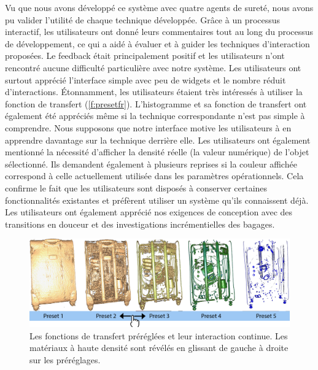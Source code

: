 Vu que nous avons développé ce système avec quatre agents de sureté, nous avons pu valider l’utilité de chaque technique développée. Grâce à un processus interactif, les utilisateurs ont donné leurs commentaires tout au long du processus de développement, ce qui a aidé à évaluer et à guider les techniques d'interaction proposées. Le feedback était principalement positif et les utilisateurs n'ont rencontré aucune difficulté particulière avec notre système. Les utilisateurs ont surtout apprécié l'interface simple avec peu de widgets et le nombre réduit d'interactions. Étonnamment, les utilisateurs étaient très intéressés à utiliser la fonction de transfert (\autoref{f:presetfr}). L'histogramme et sa fonction de transfert ont également été appréciés même si la technique correspondante n'est pas simple à comprendre. Nous supposons que notre interface motive les utilisateurs à en apprendre davantage sur la technique derrière elle. Les utilisateurs ont également mentionné la nécessité d'afficher la densité réelle (la valeur numérique) de l'objet sélectionné. Ils demandent également à plusieurs reprises si la couleur affichée correspond à celle actuellement utilisée dans les paramètres opérationnels. Cela confirme le fait que les utilisateurs sont disposés à conserver certaines fonctionnalités existantes et préfèrent utiliser un système qu'ils connaissent déjà.
Les utilisateurs ont également apprécié nos exigences de conception avec des transitions en douceur et des investigations incrémentielles des bagages.

\begin{figure}
   \centering   
	\includegraphics[width=15cm]{Figures/preset.png}
	\caption{ Les fonctions de transfert préréglées et leur interaction continue. Les matériaux à haute densité sont révélés en glissant de gauche à droite sur les préréglages. }
	\label{f:presetfr}
\end{figure}


